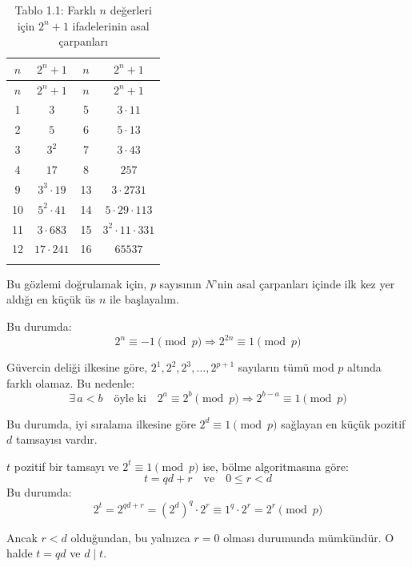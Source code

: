 \documentclass[12pt]{article}
\begin{document}
\begin{longtable}{|c|c|c|c|}
\hline
\textbf{$n$} & \textbf{$2^n + 1$} & \textbf{$n$} & \textbf{$2^n + 1$} \\
\hline
\endfirsthead
\hline
\textbf{$n$} & \textbf{$2^n + 1$} & \textbf{$n$} & \textbf{$2^n + 1$} \\
\hline
\endhead
\hline
1  & $3$                     & 5  & $3 \cdot 11$ \\
\hline
2  & $5$                     & 6  & $5 \cdot 13$ \\
\hline
3  & $3^2$                   & 7  & $3 \cdot 43$ \\
\hline
4  & $17$                    & 8  & $257$ \\
\hline
9  & $3^3 \cdot 19$          & 13 & $3 \cdot 2731$ \\
\hline
10 & $5^2 \cdot 41$          & 14 & $5 \cdot 29 \cdot 113$ \\
\hline
11 & $3 \cdot 683$           & 15 & $3^2 \cdot 11 \cdot 331$ \\
\hline
12 & $17 \cdot 241$          & 16 & $65537$ \\
\hline
\caption{Tablo 1.1: Farklı $n$ değerleri için $2^n + 1$ ifadelerinin asal çarpanları}
\label{tab:2nplus1}
\end{longtable}

\vspace{1em}

Bu gözlemi doğrulamak için, $p$ sayısının $N$'nin asal çarpanları içinde ilk kez yer aldığı en küçük üs $n$ ile başlayalım.  

Bu durumda:  
\[
2^n \equiv -1 \pmod{p} \Rightarrow 2^{2n} \equiv 1 \pmod{p}
\]

Güvercin deliği ilkesine göre, $2^1, 2^2, 2^3, \ldots, 2^{p+1}$ sayıların tümü mod $p$ altında farklı olamaz. Bu nedenle:
\[
\exists \, a < b \quad \text{öyle ki} \quad 2^a \equiv 2^b \pmod{p} \Rightarrow 2^{b-a} \equiv 1 \pmod{p}
\]

Bu durumda, iyi sıralama ilkesine göre $2^d \equiv 1 \pmod{p}$ sağlayan en küçük pozitif $d$ tamsayısı vardır.

$t$ pozitif bir tamsayı ve $2^t \equiv 1 \pmod{p}$ ise, bölme algoritmasına göre:
\[
t = qd + r \quad \text{ve} \quad 0 \leq r < d
\]
Bu durumda:
\[
2^t = 2^{qd + r} = (2^d)^q \cdot 2^r \equiv 1^q \cdot 2^r = 2^r \pmod{p}
\]

Ancak $r < d$ olduğundan, bu yalnızca $r = 0$ olması durumunda mümkündür. O halde $t = qd$ ve $d \mid t$.

\bigskip
\end{document}
